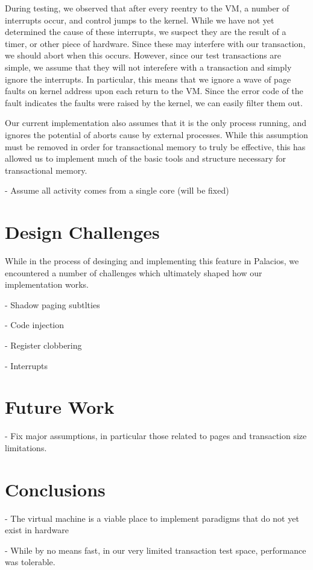\documentclass{acm_proc_article-sp}
\begin{document}
During testing, we observed that after every reentry to the VM, a number
of interrupts occur, and control jumps to the kernel. While we have not yet
determined the cause of these interrupts, we suspect they are the result of 
a timer, or other piece of hardware. Since these may interfere with our 
transaction, we should abort when this occurs. However, since our test 
transactions are simple, we assume that they will not interefere with a 
transaction and simply ignore the interrupts. In particular, this means that
we ignore a wave of page faults on kernel address upon each return to the
VM. Since the error code of the fault indicates the faults were raised by
the kernel, we can easily filter them out.   

Our current implementation also assumes that it is the only process running,
and ignores the potential of aborts cause by external processes. While this
assumption must be removed in order for transactional memory to truly be
effective, this has allowed us to implement much of the basic tools and
structure necessary for transactional memory.
 
- Assume all activity comes from a single core (will be fixed)

\section{Design Challenges}

While in the process of desinging and implementing this feature in Palacios, we
encountered a number of challenges which ultimately shaped how our implementation
works.


- Shadow paging subtlties

- Code injection

- Register clobbering

- Interrupts


\section{Future Work}

- Fix major assumptions, in particular those related to pages and 
transaction size limitations.

\section{Conclusions}

- The virtual machine is a viable place to implement paradigms that do not yet
exist in hardware

- While by no means fast, in our very limited transaction test space, 
performance was tolerable.


\end{document}
